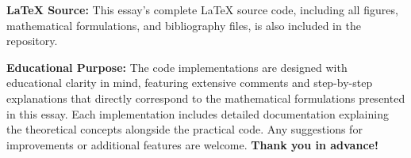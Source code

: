 \documentclass{article}
\begin{document}
\textbf{LaTeX Source:} This essay's complete LaTeX source code, including all figures, mathematical formulations, and bibliography files, is also included in the repository.

\textbf{Educational Purpose:} The code implementations are designed with educational clarity in mind, featuring extensive comments and step-by-step explanations that directly correspond to the mathematical formulations presented in this essay.
Each implementation includes detailed documentation explaining the theoretical concepts alongside the practical code. Any suggestions for improvements or additional features are welcome. \textbf{Thank you in advance!}



\end{document}
